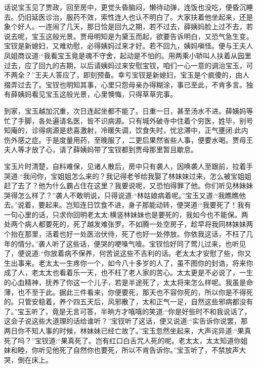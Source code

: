 


\begin{parag}
    话说宝玉见了贾政，回至房中，更觉头昏脑闷，懒待动弹，连饭也没吃，便昏沉睡去。仍旧延医诊治，服药不效，索性连人也认不明白了。大家扶着他坐起来，还是象个好人。一连闹了几天，那日恰是回九之期，若不过去，薛姨妈脸上过不去，若说去呢，宝玉这般光景。贾母明知是为黛玉而起，欲要告诉明白，又恐气急生变。宝钗是新媳妇，又难劝慰，必得姨妈过来才好。若不回九，姨妈嗔怪。便与王夫人凤姐商议道:“我看宝玉竟是魂不守舍，起动是不怕的。用两乘小轿叫人扶着从园里过去，应了回九的吉期，以后请姨妈过来安慰宝钗，咱们一心一意的调治宝玉，可不两全？”王夫人答应了，即刻预备。幸亏宝钗是新媳妇，宝玉是个疯傻的，由人掇弄过去了。宝钗也明知其事，心里只怨母亲办得糊涂，事已至此，不肯多言。独有薛姨妈看见宝玉这般光景，心里懊悔，只得草草完事。
\end{parag}


\begin{parag}
    到家，宝玉越加沉重，次日连起坐都不能了。日重一日，甚至汤水不进。薛姨妈等忙了手脚，各处遍请名医，皆不识病源。只有城外破寺中住着个穷医，姓毕，别号知庵的，诊得病源是悲喜激射，冷暖失调，饮食失时，忧忿滞中，正气壅闭:此内伤外感之症。于是度量用药，至晚服了，二更后果然省些人事，便要水喝。贾母王夫人等才放了心，请了薛姨妈带了宝钗都到贾母那里暂且歇息。
\end{parag}


\begin{parag}
    宝玉片时清楚，自料难保，见诸人散后，房中只有袭人，因唤袭人至跟前，拉着手哭道:“我问你，宝姐姐怎么来的？我记得老爷给我娶了林妹妹过来，怎么被宝姐姐赶了去了？他为什么霸占住在这里？我要说呢，又恐怕得罪了他。你们听见林妹妹哭得怎么样了？”袭人不敢明说，只得说道:“林姑娘病着呢。”宝玉又道:“我瞧瞧他去。”说着，要起来。岂知连日饮食不进，身子那能动转，便哭道:“我要死了！我有一句心里的话，只求你回明老太太:横竖林妹妹也是要死的，我如今也不能保。两处两个病人都要死的，死了越发难张罗。不如腾一处空房子，趁早将我同林妹妹两个抬在那里，活着也好一处医治伏侍，死了也好一处停放。你依我这话，不枉了几年的情分。”袭人听了这些话，便哭的哽嗓气噎。宝钗恰好同了莺儿过来，也听见了，便说道:“你放着病不保养，何苦说这些不吉利的话。老太太才安慰了些，你又生出事来。老太太一生疼你一个，如今八十多岁的人了，虽不图你的封诰，将来你成了人，老太太也看着乐一天，也不枉了老人家的苦心。太太更是不必说了，一生的心血精神，抚养了你这一个儿子，若是半途死了，太太将来怎么样呢。我虽是命薄，也不至于此。据此三件看来，你便要死，那天也不容你死的，所以你是不得死的。只管安稳着，养个四五天后，风邪散了，太和正气一足，自然这些邪病都没有了。”宝玉听了，竟是无言可答，半晌方才嘻嘻的笑道:“你是好些时不和我说话了，这会子说这些大道理的话给谁听？”宝钗听了这话，便又说道:“实告诉你说罢，那两日你不知人事的时候，林妹妹已经亡故了。”宝玉忽然坐起来，大声诧异道:“果真死了吗？”宝钗道:“果真死了。岂有红口白舌咒人死的呢。老太太，太太知道你姐妹和睦，你听见他死了自然你也要死，所以不肯告诉你。”宝玉听了，不禁放声大哭，倒在床上。
\end{parag}


